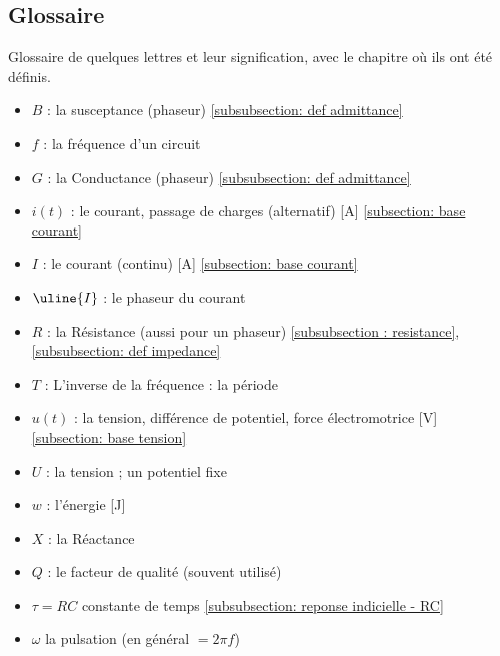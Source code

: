 \documentclass[12pt,a4paper]{article}
\newcommand{\ui}{\uline{I} }
\begin{document}
\subsection{Glossaire}
Glossaire de quelques lettres et leur signification, avec le chapitre où ils ont été définis.
\begin{itemize}
	\item 	$B$ : la susceptance (phaseur) \ref{subsubsection: def admittance}
	\item 	$f$ : la fréquence d'un circuit
	\item 	$G$ : la Conductance (phaseur) \ref{subsubsection: def admittance}
	\item 	$i(t)$ : le courant, passage de charges (alternatif) [A]  \ref{subsection: base courant}
	\item 	$I$ : le courant (continu) [A] \ref{subsection: base courant}
	\item 	$\ui$ : le phaseur du courant 
	\item 	$R$ : la Résistance (aussi pour un phaseur) \ref{subsubsection : resistance}, \ref{subsubsection: def impedance}
	\item 	$T$ : L'inverse de la fréquence : la période
	\item 	$u(t)$ : la tension, différence de potentiel, force électromotrice [V] \ref{subsection: base tension}
	\item 	$U$ : la tension ; un potentiel fixe
	\item 	$w$ : l'énergie [J]
	\item 	$X$ : la Réactance
	\item 	$Q$ : le facteur de qualité (souvent utilisé)
	\item 	$\tau = RC$ constante de temps \ref{subsubsection: reponse indicielle - RC}
	\item 	$\omega$ la pulsation (en général $=2\pi f$)
\end{itemize}
%	
\end{document}
